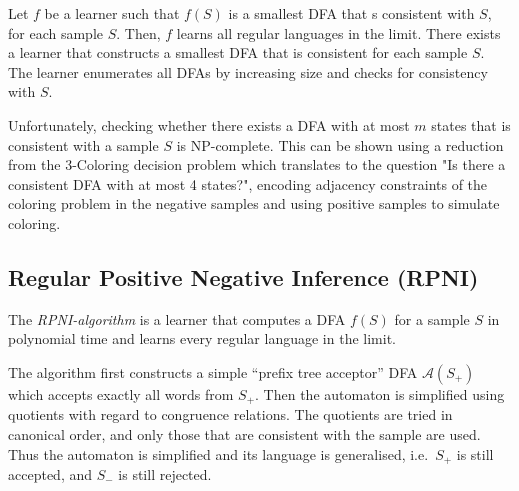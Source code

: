 \documentclass[english]{panikzettel}
\newcommand{\A}{\mathcal{A}}
\begin{document}
Let $f$ be a learner such that $f(S)$ is a smallest DFA that s consistent with $S$, for each sample $S$.
Then, $f$ learns all regular languages in the limit.
There exists a learner that constructs a smallest DFA that is consistent for each sample $S$.
The learner enumerates all DFAs by increasing size and checks for consistency with $S$.

Unfortunately, checking whether there exists a DFA with at most $m$ states that is consistent with a sample $S$ is NP-complete.
This can be shown using a reduction from the 3-Coloring decision problem which translates to the question "Is there a consistent DFA with at most 4 states?", encoding adjacency constraints of the coloring problem in the negative samples and using positive samples to simulate coloring.

\newpage
\subsection{Regular Positive Negative Inference (RPNI)}

The \emph{RPNI-algorithm} is a learner that computes a DFA $f(S)$ for a sample $S$ in polynomial time and learns every regular language in the limit.

The algorithm first constructs a simple ``prefix tree acceptor'' DFA $\A(S_+)$ which accepts exactly all words from $S_+$.
Then the automaton is simplified using quotients with regard to congruence relations.
The quotients are tried in canonical order, and only those that are consistent with the sample are used.
Thus the automaton is simplified and its language is generalised, i.e.\ $S_+$ is still accepted, and $S_-$ is still rejected.
\end{document}
